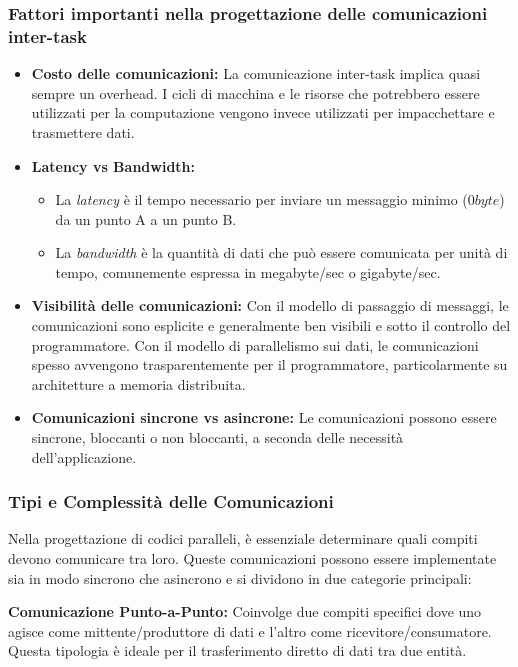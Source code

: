 \subsubsection{Fattori importanti nella progettazione
delle comunicazioni inter-task}
\begin{itemize}
    \item \textbf{Costo delle comunicazioni:} La
    comunicazione inter-task implica quasi sempre
    un overhead. I cicli di macchina e le risorse che
    potrebbero essere utilizzati per la computazione
    vengono invece utilizzati per impacchettare e
    trasmettere dati.
    \item \textbf{Latency vs Bandwidth:}
    \begin{itemize}
        \item La \textit{latency} è il tempo necessario
        per inviare un messaggio minimo ($0 byte$) da un
        punto A a un punto B.
        \item La \textit{bandwidth} è la quantità di
        dati che può essere comunicata per unità di tempo,
        comunemente espressa in megabyte/sec o
        gigabyte/sec.
    \end{itemize}
    \item \textbf{Visibilità delle comunicazioni:} Con
    il modello di passaggio di messaggi, le comunicazioni
    sono esplicite e generalmente ben visibili e sotto
    il controllo del programmatore. Con il modello di
    parallelismo sui dati, le comunicazioni spesso
    avvengono trasparentemente per il programmatore,
    particolarmente su architetture a memoria distribuita.
    \item \textbf{Comunicazioni sincrone vs asincrone:}
    Le comunicazioni possono essere sincrone, bloccanti
    o non bloccanti, a seconda delle necessità
    dell'applicazione.
\end{itemize}

\subsubsection{Tipi e Complessità delle Comunicazioni}
Nella progettazione di codici paralleli, è essenziale
determinare quali compiti devono comunicare tra loro.
Queste comunicazioni possono essere implementate sia
in modo sincrono che asincrono e si dividono in due
categorie principali:

\textbf{Comunicazione Punto-a-Punto:} Coinvolge due
compiti specifici dove uno agisce come mittente/produttore
di dati e l'altro come ricevitore/consumatore. Questa
tipologia è ideale per il trasferimento diretto di dati
tra due entità.

